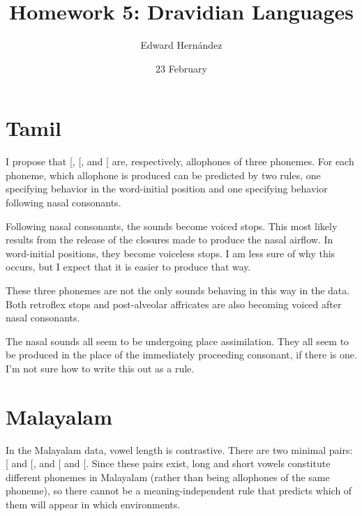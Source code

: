 \documentclass[doc,12pt]{apa6}
\begin{document}
\title{Homework 5: Dravidian Languages}
\author{Edward Hern\'{a}ndez}
\date{23 February}
\maketitle

\section{Tamil}

I propose that {[}\textipa{p b B}{]}, {[}\textipa{t d D}{]}, and {[}\textipa{k
g G}{]} are, respectively, allophones of three phonemes.  For each phoneme,
which allophone is produced can be predicted by two rules, one specifying
behavior in the word-initial position and one specifying behavior following
nasal consonants.
\begin{exe}
	\ex {}
	\ex {}
	\ex {}
	\ex {}
	\ex {}
	\ex {}
\end{exe}
Following nasal consonants, the sounds become voiced stops. This most likely
results from the release of the closures made to produce the nasal airflow.
In word-initial positions, they become voiceless stops. I am less sure of
why this occurs, but I expect that it is easier to produce that way.

These three phonemes are not the only sounds behaving in this way in the data.
Both retroflex stops and post-alveolar affricates are also becoming voiced
after nasal consonants.
\begin{exe}
	\ex {}
	\ex {}
\end{exe}

The nasal sounds all seem to be undergoing place assimilation. They all seem to
be produced in the place of the immediately proceeding consonant, if there is
one. I'm not sure how to write this out as a rule.

\section{Malayalam}

In the Malayalam data, vowel length is contrastive. There are two minimal pairs:
{[}\textipa{ke{\textrtailt}:u}{]} and {[}\textipa{ke:{\textrtailt}:u}{]}, and
{[}\textipa{ka{\textrtailt}i}{]} and {[}\textipa{ka{\textrtailt}i}{]}. Since
these pairs exist, long and short vowels constitute different phonemes in
Malayalam (rather than being allophones of the same phoneme), so there cannot
be a meaning-independent rule that predicts which of them will appear in which
environments.
\end{document}
